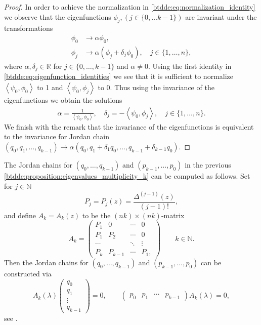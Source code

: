 \begin{proof}
In order to achieve the normalization in \cref{btdde:eq:normalization_identity} we
observe that the eigenfunctions $\phi_j, (j\in\{0,\dots k-1\})$ are invariant
under the transformations
\begin{align}
    \phi_0 &\rightarrow \alpha \phi_0, \\
    \phi_j &\rightarrow \alpha (\phi_j + \delta_j \phi_0), \quad j\in\{1,\dots,n\},
\end{align}
where $\alpha, \delta_j \in \mathbb R$ for $j\in\{0,\dots,k-1\}$ and $\alpha \neq 0$.
Using the first identity in \cref{btdde:eq:eigenfunction_identities} we see that it is sufficient
to normalize $\left< \psi_0, \phi_0 \right>$ to 1 and $\left<\psi_0, \phi_j \right>$ to 0.
Thus using the invariance of the eigenfunctions we obtain the solutions
\begin{align*}
    \alpha = \frac{1}{\left< \psi_0, \phi_0 \right>}, \quad
    \delta_j = -\left< \psi_0, \phi_j \right>, \quad j\in\{1,\dots,n\}.
\end{align*}
We finish with the remark that the invariance of the eigenfunctions is equivalent to the invariance
for Jordan chain $(q_0,q_1, \dots, q_{k-1}) \rightarrow \alpha (q_0,q_1 + \delta_1 q_0, \dots, q_{k-1} + \delta_{k-1} q_0)$.
\end{proof}

\begin{remark}
The Jordan chains for $(q_0,\dots,q_{k-1})$ and $(p_{k-1},\dots,p_0)$ in
the previous \cref{btdde:proposition:eigenvalues_multiplicity_k} can be computed
as follows. Set for $j\in\mathbb N$
\[
    P_j = P_j(z) = \frac{\Delta^{(j-1)}(z)}{(j-1)!},
\]
and define $A_k = A_k(z)$ to be the $(nk)\times(nk)$-matrix
\[
    A_k = \begin{pmatrix}
    P_1 & 0 & \cdots & 0 \\
    P_1 & P_2 & \cdots & 0 \\
    \cdots &  & \ddots & \vdots \\
    P_k & P_{k-1} & \cdots &  P_1,
    \end{pmatrix}
    \qquad k \in \mathbb N.
\]
Then the Jordan chains for $(q_0,\dots,q_{k-1})$ and  $(p_{k-1},\dots,p_0)$ can
be constructed via 
\[
A_k(\lambda)
\begin{pmatrix}
    q_0 \\
    q_1 \\
    \vdots \\
    q_{k-1}
\end{pmatrix} = 0, \qquad
\begin{pmatrix}
    p_0 & p_1 & \cdots & p_{k-1}
\end{pmatrix}
A_k(\lambda) = 0,
\]
see \cite[Chapter IV Exercise 5.11]{diekmann1995delay}.
\end{remark}

